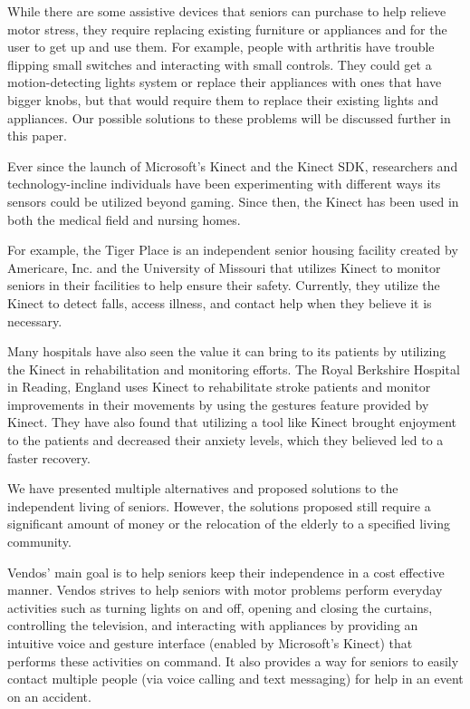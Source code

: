 \documentclass{chi-ext}
\begin{document}
While there are some assistive devices that seniors can purchase to help relieve motor stress, they require replacing existing furniture or appliances and for the user to get up and use them\cite{_assistive}.
For example, people with arthritis have trouble flipping small switches and interacting with small controls\cite{_assistive}.
They could get a motion-detecting lights system or replace their appliances with ones that have bigger knobs, but that would require them to replace their existing lights and appliances.
Our possible solutions to these problems will be discussed further in this paper.

Ever since the launch of Microsoft's Kinect and the Kinect SDK, researchers and technology-incline individuals have been experimenting with different ways its sensors could be utilized beyond gaming.
Since then, the Kinect has been used in both the medical field and nursing homes.
 
For example, the Tiger Place is an independent senior housing facility created by Americare, Inc. and the University of Missouri that utilizes Kinect to monitor seniors in their facilities to help ensure their safety\cite{_kinect}.
Currently, they utilize the Kinect to detect falls, access illness, and contact help when they believe it is necessary\cite{_kinect}.
 
Many hospitals have also seen the value it can bring to its patients by utilizing the Kinect in rehabilitation and monitoring efforts.
The Royal Berkshire Hospital in Reading, England uses Kinect to rehabilitate stroke patients and monitor improvements in their movements by using the gestures feature provided by Kinect\cite{_kinect}.
They have also found that utilizing a tool like Kinect brought enjoyment to the patients and decreased their anxiety levels, which they believed led to a faster recovery\cite{_kinect}.
 
We have presented multiple alternatives and proposed solutions to the independent living of seniors.
However, the solutions proposed still require a significant amount of money or the relocation of the elderly to a specified living community.

Vendos’ main goal is to help seniors keep their independence in a cost effective manner.
Vendos strives to help seniors with motor problems perform everyday activities such as turning lights on and off, opening and closing the curtains, controlling the television, and interacting with appliances by providing an intuitive voice and gesture interface (enabled by Microsoft's Kinect) that performs these activities on command. 
It also provides a way for seniors to easily contact multiple people (via voice calling and text messaging) for help in an event on an accident.
\end{document}
